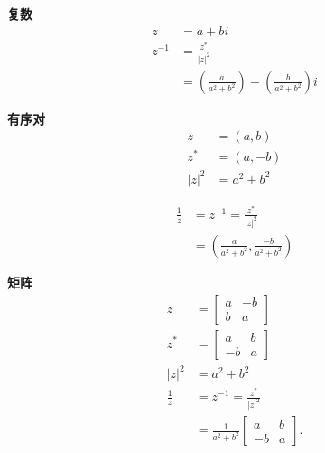 \begin{tcolorbox}[breakable, enhanced, title = {逆}]
  \textbf{复数}
  $$
    \begin{aligned}
      z      & =a+b i                                                                   \\
      z^{-1} & =\frac{z^{*}}{|z|^{2}}                                                   \\
             & =\left(\frac{a}{a^{2}+b^{2}}\right)-\left(\frac{b}{a^{2}+b^{2}}\right) i
    \end{aligned}
  $$

  \textbf{有序对}
  $$
    \begin{aligned}
      z       & =(a, b)      \\
      z^{*}   & =(a,-b)      \\
      |z|^{2} & =a^{2}+b^{2}
    \end{aligned}
  $$

  $$
    \begin{aligned}
      \frac{1}{z} & =z^{-1}=\frac{z^{*}}{|z|^{2}}                               \\
                  & =\left(\frac{a}{a^{2}+b^{2}}, \frac{-b}{a^{2}+b^{2}}\right)
    \end{aligned}
  $$

  \textbf{矩阵}
  $$
    \begin{aligned}
      z           & =\left[\begin{array}{cc}
          a & -b \\
          b & a
        \end{array}\right]                        \\
      z^{*}       & =\left[\begin{array}{cc}
          a  & b \\
          -b & a
        \end{array}\right]                        \\
      |z|^{2}     & =a^{2}+b^{2}                                                     \\
      \frac{1}{z} & =z^{-1}=\frac{z^{*}}{|z|^{2}}                                    \\
                  & =\frac{1}{a^{2}+b^{2}}\left[\begin{array}{cc}
          a  & b \\
          -b & a
        \end{array}\right] .
    \end{aligned}
  $$
\end{tcolorbox}

